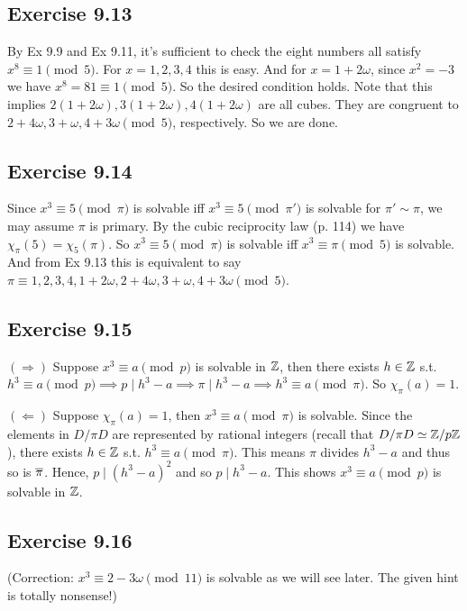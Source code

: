 \documentclass[../I&R.tex]{subfiles}
\begin{document}
\subsection*{Exercise 9.13}

By Ex 9.9 and Ex 9.11, it's sufficient to check the eight numbers all satisfy $x^8\equiv1\pmod{5}$. For $x=1,2,3,4$ this is easy. And for $x=1+2\omega$, since $x^2=-3$ we have $x^8=81\equiv1\pmod{5}$. So the desired condition holds. Note that this implies $2(1+2\omega),3(1+2\omega),4(1+2\omega)$ are all cubes. They are congruent to $2+4\omega,3+\omega,4+3\omega \pmod{5}$, respectively. So we are done.

\subsection*{Exercise 9.14}

Since $x^3\equiv5\pmod{\pi}$ is solvable iff $x^3\equiv5\pmod{\pi'}$ is solvable for $\pi'\sim\pi$, we may assume $\pi$ is primary. By the cubic reciprocity law (p. 114) we have $\chi_\pi(5)=\chi_5(\pi)$. So $x^3\equiv5\pmod{\pi}$ is solvable iff $x^3\equiv\pi\pmod{5}$ is solvable. And from Ex 9.13 this is equivalent to say $\pi\equiv1,2,3,4,1+2\omega,2+4\omega,3+\omega,4+3\omega \pmod{5}$.

\subsection*{Exercise 9.15}

$(\Rightarrow)$ Suppose $x^3\equiv a\pmod{p}$ is solvable in $\mathbb{Z}$, then there exists $h\in\mathbb{Z}$ s.t. $h^3\equiv a\pmod{p} \implies p\mid h^3-a \implies \pi\mid h^3-a \implies h^3\equiv a\pmod{\pi}$. So $\chi_\pi(a)=1$.

$(\Leftarrow)$ Suppose $\chi_\pi(a)=1$, then $x^3\equiv a\pmod{\pi}$ is solvable. Since the elements in $D/\pi D$ are represented by rational integers (recall that $D/\pi D\simeq \mathbb{Z}/p\mathbb{Z}$), there exists $h\in\mathbb{Z}$ s.t. $h^3\equiv a\pmod{\pi}$. This means $\pi$ divides $h^3-a$ and thus so is $\overline{\pi}$. Hence, $p\mid (h^3-a)^2$ and so $p\mid h^3-a$. This shows $x^3\equiv a\pmod{p}$ is solvable in $\mathbb{Z}$.

\subsection*{Exercise 9.16}

(Correction: $x^3\equiv2-3\omega\pmod{11}$ {\color{red}is} solvable as we will see later. The given hint is totally nonsense!)
\end{document}
